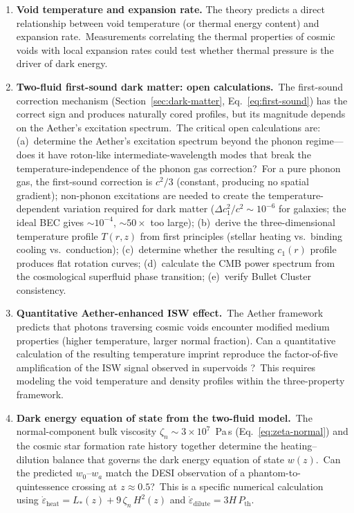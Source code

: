 ﻿\documentclass[12pt,letterpaper]{article}
\begin{document}
\begin{enumerate}[leftmargin=2em]
  \item \textbf{Void temperature and expansion rate.} The theory predicts a direct relationship between
    void temperature (or thermal energy content) and expansion rate.\ Measurements
    correlating the thermal properties of cosmic voids with local expansion rates could
    test whether thermal pressure is the driver of dark energy.

  \item \textbf{Two-fluid first-sound dark matter: open calculations.}\
    The first-sound correction mechanism (Section~\ref{sec:dark-matter},
    Eq.~\ref{eq:first-sound}) has the correct sign and produces naturally
    cored profiles, but its magnitude depends on the Aether's excitation
    spectrum.\ The critical open calculations are:
    (a)~determine the Aether's excitation spectrum beyond the phonon
    regime---does it have roton-like intermediate-wavelength modes that
    break the temperature-independence of the phonon gas correction?\
    For a pure phonon gas, the first-sound correction is $c^2/3$
    (constant, producing no spatial gradient); non-phonon excitations
    are needed to create the temperature-dependent variation required
    for dark matter ($\Delta c_1^2/c^2 \sim 10^{-6}$ for galaxies;
    the ideal BEC gives $\sim$$10^{-4}$, $\sim$$50\times$ too large);
    (b)~derive the three-dimensional temperature profile $T(r,z)$ from
    first principles (stellar heating vs.\ binding cooling vs.\ conduction);
    (c)~determine whether the resulting $c_1(r)$ profile produces flat
    rotation curves;
    (d)~calculate the CMB power spectrum from the cosmological superfluid
    phase transition;
    (e)~verify Bullet Cluster consistency.

  \item \textbf{Quantitative Aether-enhanced ISW effect.}\ The Aether
    framework predicts that photons traversing cosmic voids encounter
    modified medium properties (higher temperature, larger normal fraction).
    Can a quantitative calculation of the resulting temperature
    imprint reproduce the factor-of-five amplification of the ISW signal
    observed in supervoids \cite{kovacs2022}?\ This requires modeling
    the void temperature and density profiles within the three-property
    framework.

  \item \textbf{Dark energy equation of state from the two-fluid model.}\
    The normal-component bulk viscosity $\zeta_n \sim 3 \times 10^7$~Pa\,s
    (Eq.~\ref{eq:zeta-normal}) and the cosmic star formation rate history
    together determine the heating--dilution balance that governs the dark
    energy equation of state $w(z)$.\ Can the predicted $w_0$--$w_a$
    match the DESI observation of a phantom-to-quintessence crossing at
    $z \approx 0.5$?\ This is a specific numerical calculation using
    $\dot\varepsilon_{\mathrm{heat}} = L_*(z) +
    9\,\zeta_n\,H^2(z)$ and $\dot\varepsilon_{\mathrm{dilute}}
    = 3H\,P_{\mathrm{th}}$.


\end{enumerate}
\end{document}
